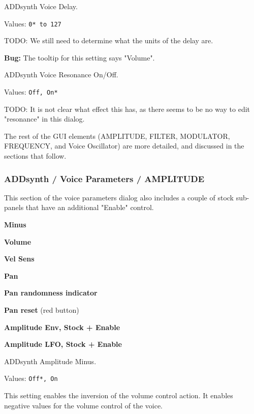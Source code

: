    ADDsynth Voice Delay.

   Values: \texttt{0* to 127}

   TODO: We still need to determine what the units of the delay are.

   \textbf{Bug:}
   The tooltip for this setting says "Volume".

   ADDsynth Voice Resonance On/Off.

   Values: \texttt{Off, On*}

   TODO: It is not clear what effect this has, as there seems to be no way
   to edit "resonance" in this dialog.

   The rest of the GUI elements
   (AMPLITUDE, FILTER, MODULATOR, FREQUENCY, and Voice Oscillator)
   are more detailed, and discussed in the sections that follow.

\subsubsection{ADDsynth / Voice Parameters / AMPLITUDE}
\label{subsubsec:addsynth_voice_parameters_amplitude}

   This section of the voice parameters dialog also includes a couple of
   stock sub-panels that have an additional "Enable" control.

   \begin{enumber}
      \item \textbf{Minus}
      \item \textbf{Volume}
      \item \textbf{Vel Sens}
      \item \textbf{Pan}
      \item \textbf{Pan randomness indicator}
      \item \textbf{Pan reset} (red button)
      \item \textbf{Amplitude Env, Stock + Enable}
      \item \textbf{Amplitude LFO, Stock + Enable}
   \end{enumber}

   \setcounter{ItemCounter}{0}      %

   ADDsynth Amplitude Minus.

   Values: \texttt{Off*, On}

   This setting enables the inversion of the volume control action.
   It enables negative values for the volume control of the voice.

